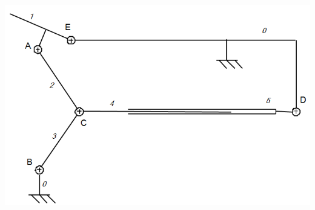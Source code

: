 \documentclass[10pt,fleqn]{article} %
\begin{document}
\newpage
$$
\quad
$$
\vspace{5cm}

\begin{center}
\includegraphics[width=.8\textwidth]{images/fig4_2}
\end{center}


%
%
%
%
%
%
%
%
%
%
%
%
%
\end{document}

